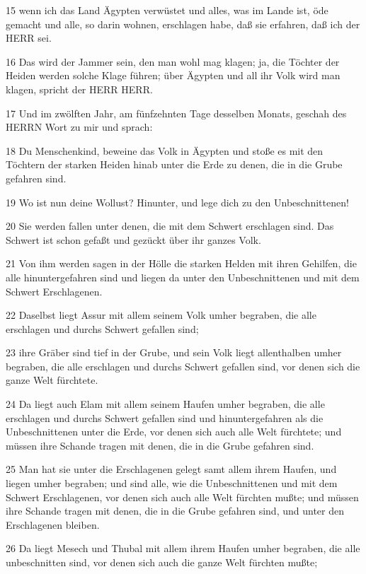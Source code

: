 \par 15 wenn ich das Land Ägypten verwüstet und alles, was im Lande ist, öde gemacht und alle, so darin wohnen, erschlagen habe, daß sie erfahren, daß ich der HERR sei.
\par 16 Das wird der Jammer sein, den man wohl mag klagen; ja, die Töchter der Heiden werden solche Klage führen; über Ägypten und all ihr Volk wird man klagen, spricht der HERR HERR.
\par 17 Und im zwölften Jahr, am fünfzehnten Tage desselben Monats, geschah des HERRN Wort zu mir und sprach:
\par 18 Du Menschenkind, beweine das Volk in Ägypten und stoße es mit den Töchtern der starken Heiden hinab unter die Erde zu denen, die in die Grube gefahren sind.
\par 19 Wo ist nun deine Wollust? Hinunter, und lege dich zu den Unbeschnittenen!
\par 20 Sie werden fallen unter denen, die mit dem Schwert erschlagen sind. Das Schwert ist schon gefaßt und gezückt über ihr ganzes Volk.
\par 21 Von ihm werden sagen in der Hölle die starken Helden mit ihren Gehilfen, die alle hinuntergefahren sind und liegen da unter den Unbeschnittenen und mit dem Schwert Erschlagenen.
\par 22 Daselbst liegt Assur mit allem seinem Volk umher begraben, die alle erschlagen und durchs Schwert gefallen sind;
\par 23 ihre Gräber sind tief in der Grube, und sein Volk liegt allenthalben umher begraben, die alle erschlagen und durchs Schwert gefallen sind, vor denen sich die ganze Welt fürchtete.
\par 24 Da liegt auch Elam mit allem seinem Haufen umher begraben, die alle erschlagen und durchs Schwert gefallen sind und hinuntergefahren als die Unbeschnittenen unter die Erde, vor denen sich auch alle Welt fürchtete; und müssen ihre Schande tragen mit denen, die in die Grube gefahren sind.
\par 25 Man hat sie unter die Erschlagenen gelegt samt allem ihrem Haufen, und liegen umher begraben; und sind alle, wie die Unbeschnittenen und mit dem Schwert Erschlagenen, vor denen sich auch alle Welt fürchten mußte; und müssen ihre Schande tragen mit denen, die in die Grube gefahren sind, und unter den Erschlagenen bleiben.
\par 26 Da liegt Mesech und Thubal mit allem ihrem Haufen umher begraben, die alle unbeschnitten sind, vor denen sich auch die ganze Welt fürchten mußte;
